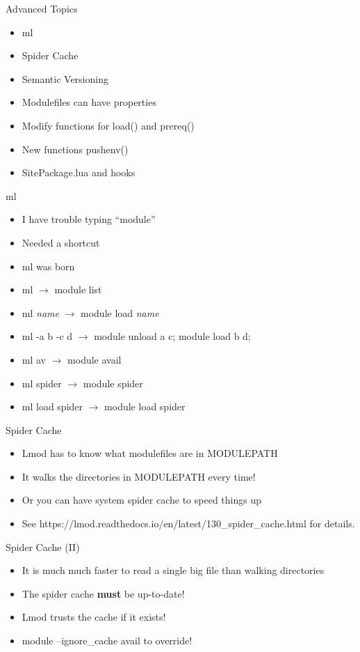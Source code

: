 \documentclass{beamer}
\begin{document}
\begin{frame}{Advanced Topics}
  \begin{itemize}
    \item ml 
    \item Spider Cache
    \item Semantic Versioning
    \item Modulefiles can have properties
    \item Modify functions for load() and prereq()
    \item New functions pushenv()
    \item SitePackage.lua and hooks
  \end{itemize}
\end{frame}

\begin{frame}{ml}
  \begin{itemize}
    \item I have trouble typing ``module''
    \item Needed a shortcut
    \item ml was born
    \item ml $\rightarrow$ module list
    \item ml \emph{name} $\rightarrow$ module load \emph{name}
    \item ml -a b -c d $\rightarrow$ module unload a c; module load b d; 
    \item ml av $\rightarrow$ module avail
    \item ml spider $\rightarrow$ module spider
    \item ml load spider $\rightarrow$ module load spider
  \end{itemize}
\end{frame}

\begin{frame}{Spider Cache}
  \begin{itemize}
    \item Lmod has to know what modulefiles are in MODULEPATH
    \item It walks the directories in MODULEPATH every time!
    \item Or you can have system spider cache to speed things up
    \item See
      https://lmod.readthedocs.io/en/latest/130\_spider\_cache.html for
      details.
  \end{itemize}
\end{frame}

\begin{frame}{Spider Cache (II)}
  \begin{itemize}
    \item It is much much faster to read a single big file than
      walking directories
    \item The spider cache \textbf{must} be up-to-date!
    \item Lmod trusts the cache if it exists!
    \item module --ignore\_cache avail to override!
  \end{itemize}
\end{frame}
\end{document}
